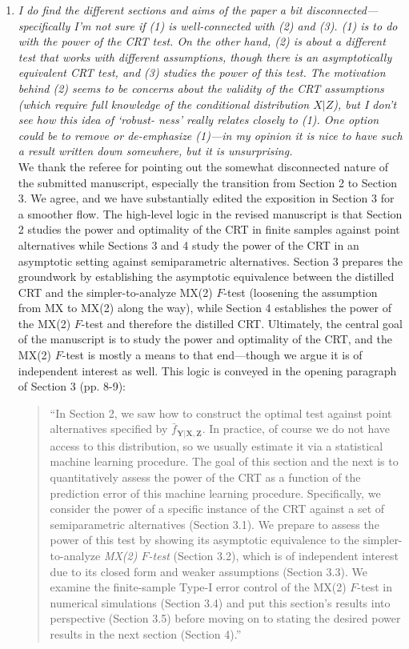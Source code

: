 \documentclass[12pt]{article}
\begin{document}
\begin{enumerate}
	\item \textsl{I do find the different sections and aims of the paper a bit disconnected— specifically I’m not sure if (1) is well-connected with (2) and (3). (1) is to do with the power of the CRT test. On the other hand, (2) is about a different test that works with different assumptions, though there is an asymptotically equivalent CRT test, and (3) studies the power of this test. The motivation behind (2) seems to be concerns about the validity of the CRT assumptions (which require full knowledge of the conditional distribution $X|Z$), but I don’t see how this idea of ‘robust- ness’ really relates closely to (1). One option could be to remove or de-emphasize (1)—in my opinion it is nice to have such a result written down somewhere, but it is unsurprising.}\\
	
	We thank the referee for pointing out the somewhat disconnected nature of the submitted manuscript, especially the transition from Section 2 to Section 3. We agree, and we have substantially edited the exposition in Section 3 for a smoother flow. The high-level logic in the revised manuscript is that Section 2 studies the power and optimality of the CRT in finite samples against point alternatives while Sections 3 and 4 study the power of the CRT in an asymptotic setting against semiparametric alternatives. Section 3 prepares the groundwork by establishing the asymptotic equivalence between the distilled CRT and the simpler-to-analyze MX(2) $F$-test (loosening the assumption from MX to MX(2) along the way), while Section 4 establishes the power of the MX(2) $F$-test and therefore the distilled CRT. Ultimately, the central goal of the manuscript is to study the power and optimality of the CRT, and the MX(2) $F$-test is mostly a means to that end---though we argue it is of independent interest as well. This logic is conveyed in the opening paragraph of Section 3 (pp. 8-9):
	
	\begin{quote}
		``In Section 2, we saw how to construct the optimal test against point alternatives specified by $\bar f_{\bm Y| \bm X, \bm Z}$. In practice, of course we do not have access to this distribution, so we usually estimate it via a statistical machine learning procedure. The goal of this section and the next is to quantitatively assess the power of the CRT as a function of the prediction error of this machine learning procedure. Specifically, we consider  the power of a specific instance of the CRT against a set of semiparametric alternatives (Section 3.1). We prepare to assess the power of this test by showing its asymptotic equivalence to the simpler-to-analyze \textit{MX(2) $F$-test} (Section 3.2), which is of independent interest due to its closed form and weaker assumptions (Section 3.3). We examine the finite-sample Type-I error control of the MX(2) $F$-test in numerical simulations (Section 3.4) and put this section's results into perspective (Section 3.5) before moving on to stating the desired power results in the next section (Section 4).''
	\end{quote}
	 	

\end{enumerate}
\end{document}
